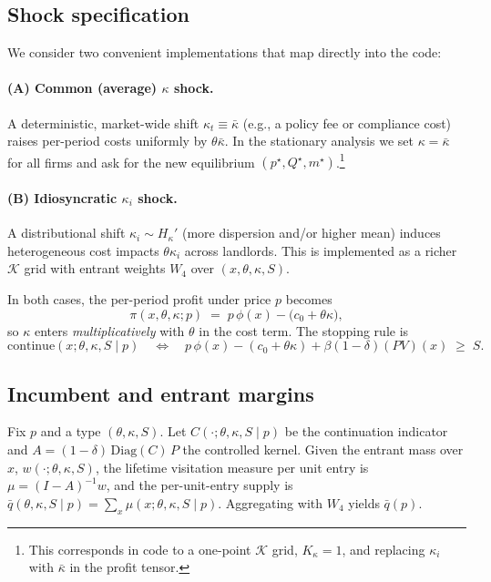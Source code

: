 \documentclass[11pt]{article}
\begin{document}
\subsection{Shock specification}

We consider two convenient implementations that map directly into the code:

\paragraph{(A) Common (average) $\kappa$ shock.}
A deterministic, market-wide shift $\kappa_t\equiv \bar\kappa$ (e.g., a policy fee or compliance cost) raises per-period costs uniformly by $\theta\bar\kappa$. In the stationary analysis we set $\kappa=\bar\kappa$ for all firms and ask for the new equilibrium $(p^\star,Q^\star,m^\star)$.\footnote{%
This corresponds in code to a one-point $\mathcal{K}$ grid, $K_\kappa=1$, and replacing $\kappa_i$ with $\bar\kappa$ in the profit tensor.}

\paragraph{(B) Idiosyncratic $\kappa_i$ shock.}
A distributional shift $\kappa_i\sim H_\kappa'$ (more dispersion and/or higher mean) induces heterogeneous cost impacts $\theta\kappa_i$ across landlords. This is implemented as a richer $\mathcal{K}$ grid with entrant weights $W_4$ over $(x,\theta,\kappa,S)$.

In both cases, the per-period profit under price $p$ becomes
\[
\pi(x,\theta,\kappa;p) \;=\; p\,\phi(x) - \big(c_0 + \theta\kappa\big),
\]
so $\kappa$ enters \emph{multiplicatively} with $\theta$ in the cost term. The stopping rule is
\[
\text{continue}(x;\theta,\kappa,S\mid p)
\quad\Longleftrightarrow\quad
p\,\phi(x) - (c_0+\theta\kappa) + \beta(1-\delta)(PV)(x) \;\ge\; S.
\]

\subsection{Incumbent and entrant margins}

Fix $p$ and a type $(\theta,\kappa,S)$. Let $C(\cdot;\theta,\kappa,S\mid p)$ be the continuation indicator and
\(
A=(1-\delta)\,\mathrm{Diag}(C)\,P
\)
the controlled kernel. Given the entrant mass over $x$, $w(\cdot;\theta,\kappa,S)$, the lifetime visitation measure per unit entry is
\(
\mu = (I-A)^{-1}w
\),
and the per-unit-entry supply is
\(
\bar q(\theta,\kappa,S\mid p)=\sum_x \mu(x;\theta,\kappa,S\mid p)
\).
Aggregating with $W_4$ yields $\bar q(p)$.
\end{document}
